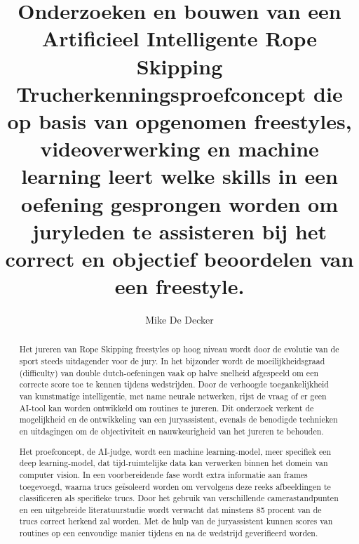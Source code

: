 \documentclass[english]{hogent-article}
\title{Onderzoeken en bouwen van een Artificieel Intelligente Rope Skipping Trucherkenningsproefconcept die op basis van opgenomen freestyles, videoverwerking en machine learning leert welke skills in een oefening gesprongen worden om juryleden te assisteren bij het correct en objectief beoordelen van een freestyle.}
\author{Mike De Decker}
\begin{document}
\begin{abstract}
Het jureren van Rope Skipping freestyles op hoog niveau wordt door de evolutie van de sport steeds uitdagender voor de jury. In het bijzonder wordt de moeilijkheidsgraad (difficulty) van double dutch-oefeningen vaak op halve snelheid afgespeeld om een correcte score toe te kennen tijdens wedstrijden. Door de verhoogde toegankelijkheid van kunstmatige intelligentie, met name neurale netwerken, rijst de vraag of er geen AI-tool kan worden ontwikkeld om routines te jureren. Dit onderzoek verkent de mogelijkheid en de ontwikkeling van een juryassistent, evenals de benodigde technieken en uitdagingen om de objectiviteit en nauwkeurigheid van het jureren te behouden.

Het proefconcept, de AI-judge, wordt een machine learning-model, meer specifiek een deep learning-model, dat tijd-ruimtelijke data kan verwerken binnen het domein van computer vision. In een voorbereidende fase wordt extra informatie aan frames toegevoegd, waarna trucs geïsoleerd worden om vervolgens deze reeks afbeeldingen te classificeren als specifieke trucs. Door het gebruik van verschillende camerastandpunten en een uitgebreide literatuurstudie wordt verwacht dat minstens 85 procent van de trucs correct herkend zal worden. Met de hulp van de juryassistent kunnen scores van routines op een eenvoudige manier tijdens en na de wedstrijd geverifieerd worden.
\end{abstract}

\tableofcontents



\printbibliography[heading=bibintoc]
\end{document}

